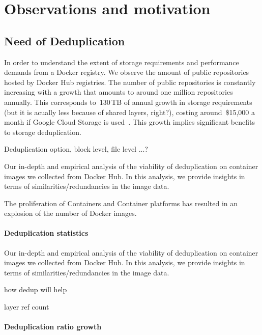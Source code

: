 \section{Observations and motivation} %
\label{sec:background}

\subsection{Need of Deduplication}

In order to understand the extent of storage requirements and performance demands from a Docker registry. 
We observe the amount of public repositories hosted by Docker Hub registries. 
The number of public repositories is constantly increasing with a growth that amounts 
to around one million repositories annually. 
This corresponds to~130\,TB of annual growth in storage requirements (but it is acually less because of shared layers, right?), 
costing around~\$15,000 a month if Google Cloud Storage is used~\cite{GoogleCloudStoragePricing}.
This growth implies significant benefits to storage deduplication. 

Deduplication option, block level, file level ...?

Our in-depth and empirical analysis of the viability of deduplication on container images we collected from Docker Hub. In this analysis, we provide insights in terms of similarities/redundancies in the image data. 

The proliferation of Containers and Container platforms has resulted in an explosion of the number of Docker images.


\paragraph{Deduplication statistics} %

Our in-depth and empirical analysis of the viability of deduplication on container images we collected from Docker Hub. In this analysis, we provide insights in terms of similarities/redundancies in the image data. 

how dedup will help


layer ref count 

\paragraph{Deduplication ratio growth} %


